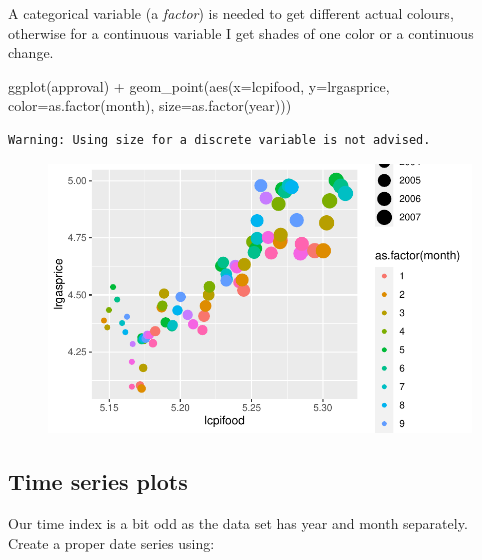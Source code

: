 \documentclass[
  letterpaper,
]{book}
\newenvironment{Shaded}{\begin{snugshade}}{\end{snugshade}}
\newcommand{\AttributeTok}[1]{\textcolor[rgb]{0.40,0.45,0.13}{#1}}
\newcommand{\FunctionTok}[1]{\textcolor[rgb]{0.28,0.35,0.67}{#1}}
\newcommand{\NormalTok}[1]{\textcolor[rgb]{0.00,0.23,0.31}{#1}}
\newcommand{\SpecialCharTok}[1]{\textcolor[rgb]{0.37,0.37,0.37}{#1}}
\begin{document}
A categorical variable (a \emph{factor}) is needed to get different
actual colours, otherwise for a continuous variable I get shades of one
color or a continuous change.

\begin{Shaded}
\begin{Highlighting}[]
\FunctionTok{ggplot}\NormalTok{(approval) }\SpecialCharTok{+}
  \FunctionTok{geom\_point}\NormalTok{(}\FunctionTok{aes}\NormalTok{(}\AttributeTok{x=}\NormalTok{lcpifood, }\AttributeTok{y=}\NormalTok{lrgasprice, }\AttributeTok{color=}\FunctionTok{as.factor}\NormalTok{(month), }\AttributeTok{size=}\FunctionTok{as.factor}\NormalTok{(year)))}
\end{Highlighting}
\end{Shaded}

\begin{verbatim}
Warning: Using size for a discrete variable is not advised.
\end{verbatim}

\begin{figure}[H]

{\centering \includegraphics{Appendix1_files/figure-pdf/p3-1.pdf}

}

\end{figure}

\hypertarget{time-series-plots}{%
\subsection{Time series plots}\label{time-series-plots}}

Our time index is a bit odd as the data set has year and month
separately. Create a proper date series using:
\end{document}

